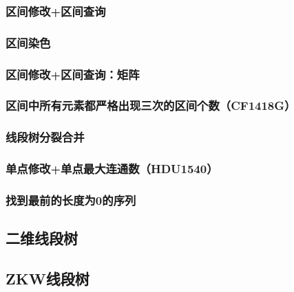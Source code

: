 \documentclass[landscape,twocolumn,twoside,a4paper]{article}
\begin{document}
\subsubsection{区间修改+区间查询}


\subsubsection{区间染色}


\subsubsection{区间修改+区间查询：矩阵}


\subsubsection{区间中所有元素都严格出现三次的区间个数（CF1418G）}


\subsubsection{线段树分裂合并}


\subsubsection{单点修改+单点最大连通数（HDU1540）}


\subsubsection{找到最前的长度为0的序列}


\subsection{二维线段树}



\subsection{ZKW线段树}
\end{document}
